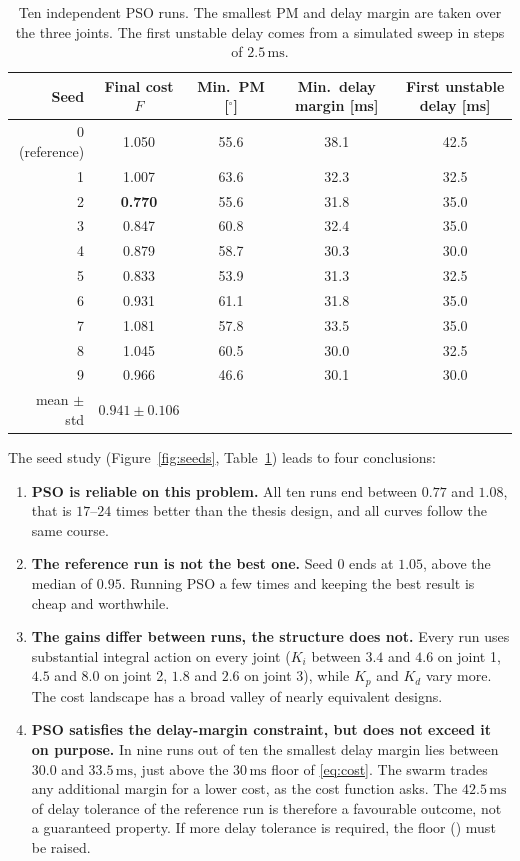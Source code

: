 \documentclass[11pt,a4paper]{article}
\newcommand{\code}[1]{\texttt{\detokenize{#1}}}
\begin{document}
\begin{table}[H]
\centering
\small
\begin{tabular}{rcccc}
\toprule
Seed & Final cost $F$ & Min.\ PM [$^\circ$] & Min.\ delay margin [ms] & First unstable delay [ms]\\
\midrule
0 (reference) & 1.050 & 55.6 & 38.1 & 42.5\\
1 & 1.007 & 63.6 & 32.3 & 32.5\\
2 & \textbf{0.770} & 55.6 & 31.8 & 35.0\\
3 & 0.847 & 60.8 & 32.4 & 35.0\\
4 & 0.879 & 58.7 & 30.3 & 30.0\\
5 & 0.833 & 53.9 & 31.3 & 32.5\\
6 & 0.931 & 61.1 & 31.8 & 35.0\\
7 & 1.081 & 57.8 & 33.5 & 35.0\\
8 & 1.045 & 60.5 & 30.0 & 32.5\\
9 & 0.966 & 46.6 & 30.1 & 30.0\\
\midrule
mean $\pm$ std & $0.941 \pm 0.106$ & & & \\
\bottomrule
\end{tabular}
\caption{Ten independent PSO runs. The smallest PM and delay margin are taken over the three joints. The
first unstable delay comes from a simulated sweep in steps of $2.5\,\mathrm{ms}$.}
\label{tab:seeds}
\end{table}

The seed study (Figure~\ref{fig:seeds}, Table~\ref{tab:seeds}) leads to four conclusions:
\begin{enumerate}
  \item \textbf{PSO is reliable on this problem.} All ten runs end between $0.77$ and $1.08$, that is
        $17$--$24$ times better than the thesis design, and all curves follow the same course.
  \item \textbf{The reference run is not the best one.} Seed 0 ends at $1.05$, above the median of
        $0.95$. Running PSO a few times and keeping the best result is cheap and worthwhile.
  \item \textbf{The gains differ between runs, the structure does not.} Every run uses substantial
        integral action on every joint ($K_i$ between $3.4$ and $4.6$ on joint 1, $4.5$ and $8.0$ on joint 2,
        $1.8$ and $2.6$ on joint 3), while $K_p$ and $K_d$ vary more. The cost landscape has a broad valley
        of nearly equivalent designs.
  \item \textbf{PSO satisfies the delay-margin constraint, but does not exceed it on purpose.} In nine runs
        out of ten the smallest delay margin lies between $30.0$ and $33.5\,\mathrm{ms}$, just above the
        $30\,\mathrm{ms}$ floor of \eqref{eq:cost}. The swarm trades any additional margin for a lower cost,
        as the cost function asks. The $42.5\,\mathrm{ms}$ of delay tolerance of the reference run is
        therefore a favourable outcome, not a guaranteed property. If more delay tolerance is required, the
        floor (\code{dm_min}) must be raised.
\end{enumerate}
\end{document}
